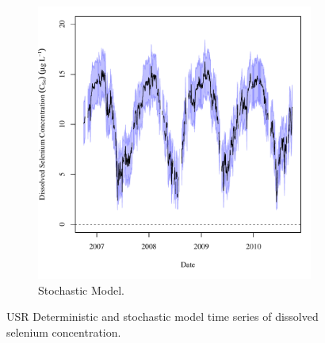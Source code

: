 \begin{linenumbers}
\begin{landscape}
\begin{figure}
\begin{subfigure}{0.7\textwidth}
			\includegraphics[width=\tableCustomSize]{"Figures/Results_USR/Stochastic/c TS FLY"}
			\caption{Stochastic Model.}
		\end{subfigure}
		\caption{USR Deterministic and stochastic model time series of dissolved selenium concentration.}
	\end{figure}
\end{landscape}


\end{linenumbers}
